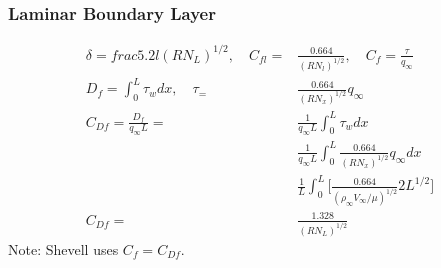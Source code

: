 \documentclass[draft=false, titlepage]{article}
\begin{document}
\subsubsection{Laminar Boundary Layer}
\begin{align*}
\delta = frac{5.2l}{(RN_L)^{1/2}},\quad C_{fl} =& \frac{0.664}{(RN_l)^{1/2}},\quad C_f = \frac{\tau}{q_\infty}\\
D_f = \int_0^L \tau_w dx ,\quad \tau_=& \frac{0.664}{(RN_x)^{1/2}}q_\infty\\
C_{Df} = \frac{D_f}{q_\infty L}=& \frac{1}{q_\infty L}\int_0^L \tau_w dx\\
& \frac{1}{q_\infty L}\int_0^L \frac{0.664}{(RN_x)^{1/2}}q_\infty dx\\
& \frac{1}{L}\int_0^L \Big[ \frac{0.664}{(\rho_\infty V_\infty/\mu)^{1/2}}2L^{1/2} \Big]\\
C_{Df} =& \frac{1.328}{(RN_L)^{1/2}}
\end{align*}
Note: Shevell uses $C_f = C_{Df}$.
\end{document}

